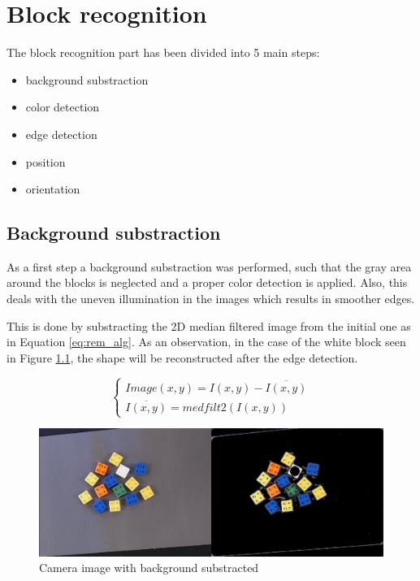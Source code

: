
\chapter{Block recognition}\label{ch:block_recognition}

The block recognition part has been divided into 5 main steps: 
\begin{itemize}
  \item background substraction
  \item color detection
  \item edge detection
  \item position
  \item orientation
\end{itemize}

\section{Background substraction}
As a first step a background substraction was performed, such that the gray area around the blocks is neglected and a proper color detection is applied. Also, this deals with the uneven illumination in the images which results in smoother edges. 

This is done by substracting the 2D median filtered image from the initial one as in Equation \ref{eq:rem_alg}. As an observation, in the case of the white block seen in Figure \ref{fig:rem_back}, the shape will be reconstructed after the edge detection. 

\begin{equation}\label{eq:rem_alg}
  \begin{cases}
    Image(x,y) = I(x,y) - \overline{I(x,y)} \\
    \overline{I(x,y)} = medfilt2(I(x,y))
  \end{cases}
\end{equation}

\begin{figure}[H]
  \centering
  \includegraphics[scale=0.5]{figures/remove_background.png}
  \caption{Camera image with background substracted}
  \label{fig:rem_back}
\end{figure}

